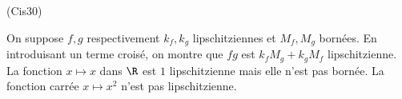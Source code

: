 \begin{tiny}(Cis30)\end{tiny} On suppose $f, g$ respectivement $k_f, k_g$ lipschitziennes et $M_f, M_g$ bornées.\newline
En introduisant un terme croisé, on montre que $fg$ est $k_f M_g + k_g M_f$ lipschitzienne.\newline
La fonction $x\mapsto x$ dans $\R$ est $1$ lipschitzienne mais elle n'est pas bornée. La fonction carrée $x\mapsto x^2$ n'est pas lipschitzienne.
